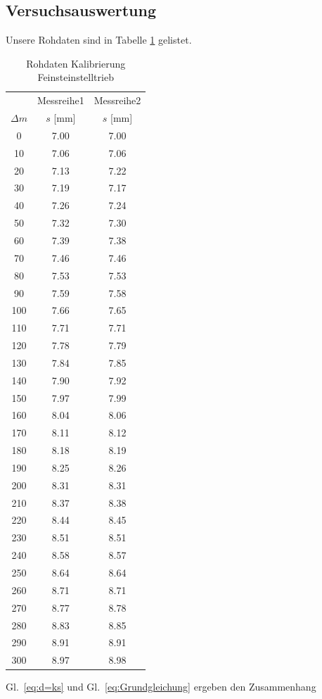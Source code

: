 \documentclass[12pt,a4paper]{article}
\begin{document}
\subsection{Versuchsauswertung}
Unsere Rohdaten sind in Tabelle \ref{table:RohdatenKalibrierung} gelistet.
\begin{table}[H]
	\centering
	\begin{tabular}{|c|c|c|}
		\hline
		&Messreihe1&Messreihe2\\
		$\Delta m$&$s$ [mm]&$s$ [mm]\\
		\hline
		0&7.00&7.00\\
		10&7.06&7.06\\
		20&7.13&7.22\\
		30&7.19&7.17\\
		40&7.26&7.24\\
		50&7.32&7.30\\
		60&7.39&7.38\\
		70&7.46&7.46\\
		80&7.53&7.53\\
		90&7.59&7.58\\
		100&7.66&7.65\\
		110&7.71&7.71\\
		120&7.78&7.79\\
		130&7.84&7.85\\
		140&7.90&7.92\\
		150&7.97&7.99\\
		160&8.04&8.06\\
		170&8.11&8.12\\
		180&8.18&8.19\\
		190&8.25&8.26\\
		200&8.31&8.31\\
		210&8.37&8.38\\
		220&8.44&8.45\\
		230&8.51&8.51\\
		240&8.58&8.57\\
		250&8.64&8.64\\
		260&8.71&8.71\\
		270&8.77&8.78\\
		280&8.83&8.85\\
		290&8.91&8.91\\
		300&8.97&8.98\\
		\hline
	\end{tabular}
	\caption{Rohdaten Kalibrierung Feinsteinstelltrieb}
	\label{table:RohdatenKalibrierung}
\end{table}
Gl.~\eqref{eq:d=ks} und Gl.~\eqref{eq:Grundgleichung} ergeben den Zusammenhang
\end{document}
